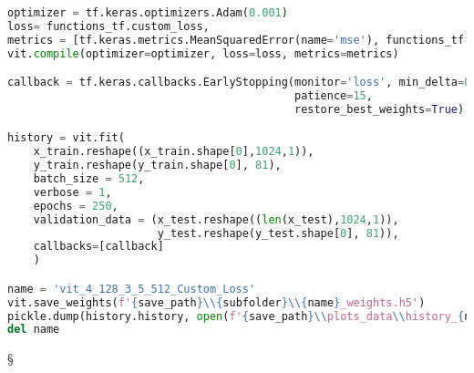 \begin{lstlisting}[language=Python]
optimizer = tf.keras.optimizers.Adam(0.001)
loss= functions_tf.custom_loss,
metrics = [tf.keras.metrics.MeanSquaredError(name='mse'), functions_tf.custom_accuracy]
vit.compile(optimizer=optimizer, loss=loss, metrics=metrics)

callback = tf.keras.callbacks.EarlyStopping(monitor='loss', min_delta=0.0001,
                                            patience=15,
                                            restore_best_weights=True)

history = vit.fit(
    x_train.reshape((x_train.shape[0],1024,1)),
    y_train.reshape(y_train.shape[0], 81),
    batch_size = 512,
    verbose = 1,
    epochs = 250,
    validation_data = (x_test.reshape((len(x_test),1024,1)),
                       y_test.reshape(y_test.shape[0], 81)),
    callbacks=[callback]
    )

name = 'vit_4_128_3_5_512_Custom_Loss'
vit.save_weights(f'{save_path}\\{subfolder}\\{name}_weights.h5')
pickle.dump(history.history, open(f'{save_path}\\plots_data\\history_{name}.pkl', 'wb'))
del name
\end{lstlisting}§